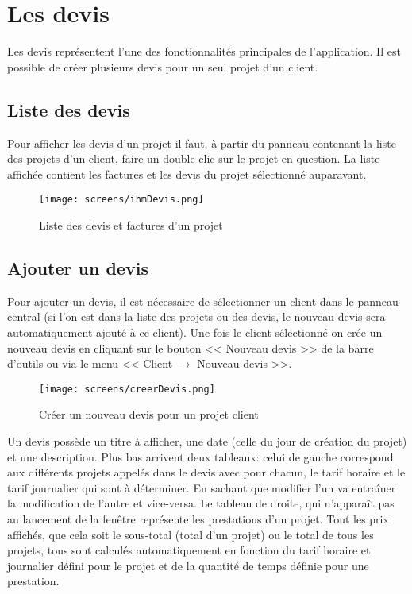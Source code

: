 \chapter{Les devis}
Les devis représentent l'une des fonctionnalités principales de l'application. Il est possible de créer plusieurs devis pour un seul projet d'un client. 
\section{Liste des devis}
Pour afficher les devis d'un projet il faut, à partir du panneau contenant la liste des projets d'un client, faire un double clic sur le projet en question. La liste affichée contient les factures et les devis du projet sélectionné auparavant.
\begin{figure}[H]
	\centering
	\texttt{[image: screens/ihmDevis.png]}
	\caption{Liste des devis et factures d'un projet}
\end{figure}

\section{Ajouter un devis}
\label{ch:ajoutDevis}
Pour ajouter un devis, il est nécessaire de sélectionner un client dans le panneau central (si l'on est dans la liste des projets ou des devis, le nouveau devis sera automatiquement ajouté à ce client). Une fois le client sélectionné on crée un nouveau devis en cliquant sur le bouton << Nouveau devis >> de la barre d'outils ou via le menu << Client $\rightarrow$ Nouveau devis >>. 
\begin{figure}[H]
	\centering
	\texttt{[image: screens/creerDevis.png]}
	\caption{Créer un nouveau devis pour un projet client}
	\label{fig:creerDevis}
\end{figure}
Un devis possède un titre à afficher, une date (celle du jour de création du projet) et une description. Plus bas arrivent deux tableaux: celui de gauche correspond aux différents projets appelés dans le devis avec pour chacun, le tarif horaire et le tarif journalier qui sont à déterminer. En sachant que modifier l'un va entraîner la modification de l'autre et vice-versa. Le tableau de droite, qui n'apparaît pas au lancement de la fenêtre représente les prestations d'un projet. Tout les prix affichés, que cela soit le sous-total (total d'un projet) ou le total de tous les projets, tous sont calculés automatiquement en fonction du tarif horaire et journalier défini pour le projet et de la quantité de temps définie pour une prestation.

